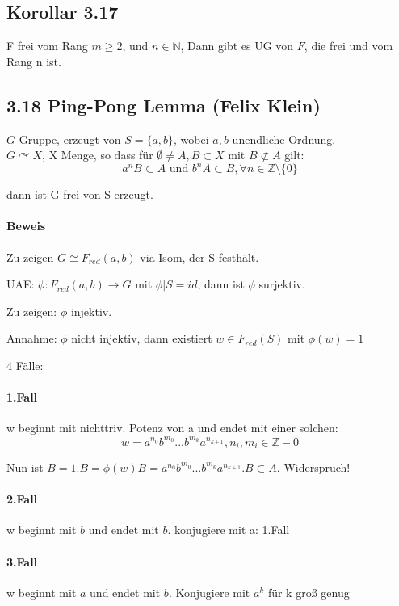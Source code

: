 \documentclass{article}
\newcommand{\N}{\mathbb{N}}
\newcommand{\Z}{\mathbb{Z}}
\begin{document}
\subsection{Korollar 3.17}
F frei vom Rang $m \geq 2$, und $n\in \N$, Dann gibt es UG von $F$, die frei und vom Rang n ist.

\subsection{3.18 Ping-Pong Lemma (Felix Klein)}
$G$ Gruppe, erzeugt von $S = \{a,b\}$, wobei $a,b$ unendliche Ordnung.\\
$G \curvearrowright X$, X Menge, so dass für $\emptyset \neq A, B \subset X$
mit $B \not \subset A$ gilt:
\[a^nB \subset A \text{ und } b^nA \subset B, \forall n \in \Z\setminus\{0\} \]

dann ist G frei von S erzeugt.

\paragraph{Beweis}
Zu zeigen $G \cong F_{red}(a,b)$ via Isom, der S festhält.

UAE:
$\phi : F_{red}(a,b) \longrightarrow G$ mit $\phi|S = id$, dann ist $\phi$ surjektiv.

Zu zeigen: $\phi$ injektiv.

Annahme: $\phi$ nicht injektiv, dann existiert $w\in F_{red}(S)$ mit $\phi(w) = 1$

4 Fälle: 

\paragraph{1.Fall}
w beginnt mit nichttriv. Potenz von a und endet mit einer solchen:
\[w = a^{n_0}b^{m_0}...b^{m_k}a^{n_{k+1}}, n_i, m_i \in \Z- 0 \]

Nun ist $B = 1.B = \phi(w)B = a^{n_0}b^{m_0}...b^{m_k}a^{n_{k+1}}.B \subset A$. Widerspruch!

\paragraph{2.Fall}
w beginnt mit $b$ und endet mit $b$. konjugiere mit a: 1.Fall

\paragraph{3.Fall}
w beginnt mit $a$ und endet mit $b$. Konjugiere mit $a^k$ für k groß genug
\end{document}
